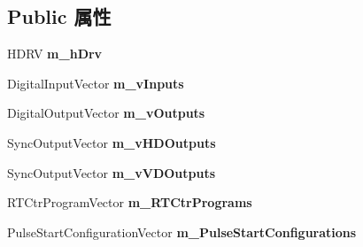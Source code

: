 \subsection*{Public 属性}
\begin{DoxyCompactItemize}
\item 
\hypertarget{structmv_i_m_p_a_c_t_1_1acquire_1_1_i_o_sub_system_1_1_reference_counted_data_a4e64b1cd28107f63b1f9ac99cd8bc306}{H\+D\+R\+V {\bfseries m\+\_\+h\+Drv}}\label{structmv_i_m_p_a_c_t_1_1acquire_1_1_i_o_sub_system_1_1_reference_counted_data_a4e64b1cd28107f63b1f9ac99cd8bc306}

\item 
\hypertarget{structmv_i_m_p_a_c_t_1_1acquire_1_1_i_o_sub_system_1_1_reference_counted_data_a10633fcae955c4242f1f56d23d9629fc}{Digital\+Input\+Vector {\bfseries m\+\_\+v\+Inputs}}\label{structmv_i_m_p_a_c_t_1_1acquire_1_1_i_o_sub_system_1_1_reference_counted_data_a10633fcae955c4242f1f56d23d9629fc}

\item 
\hypertarget{structmv_i_m_p_a_c_t_1_1acquire_1_1_i_o_sub_system_1_1_reference_counted_data_af07070e5622ebde6387814ab2079711f}{Digital\+Output\+Vector {\bfseries m\+\_\+v\+Outputs}}\label{structmv_i_m_p_a_c_t_1_1acquire_1_1_i_o_sub_system_1_1_reference_counted_data_af07070e5622ebde6387814ab2079711f}

\item 
\hypertarget{structmv_i_m_p_a_c_t_1_1acquire_1_1_i_o_sub_system_1_1_reference_counted_data_a3d56c23dc9460cdf2979a09a31b69967}{Sync\+Output\+Vector {\bfseries m\+\_\+v\+H\+D\+Outputs}}\label{structmv_i_m_p_a_c_t_1_1acquire_1_1_i_o_sub_system_1_1_reference_counted_data_a3d56c23dc9460cdf2979a09a31b69967}

\item 
\hypertarget{structmv_i_m_p_a_c_t_1_1acquire_1_1_i_o_sub_system_1_1_reference_counted_data_a2652c5a5d247544f5c5482f449d91fe8}{Sync\+Output\+Vector {\bfseries m\+\_\+v\+V\+D\+Outputs}}\label{structmv_i_m_p_a_c_t_1_1acquire_1_1_i_o_sub_system_1_1_reference_counted_data_a2652c5a5d247544f5c5482f449d91fe8}

\item 
\hypertarget{structmv_i_m_p_a_c_t_1_1acquire_1_1_i_o_sub_system_1_1_reference_counted_data_aba8bc8a1f54c1479e8d5ff8a18494767}{R\+T\+Ctr\+Program\+Vector {\bfseries m\+\_\+\+R\+T\+Ctr\+Programs}}\label{structmv_i_m_p_a_c_t_1_1acquire_1_1_i_o_sub_system_1_1_reference_counted_data_aba8bc8a1f54c1479e8d5ff8a18494767}

\item 
\hypertarget{structmv_i_m_p_a_c_t_1_1acquire_1_1_i_o_sub_system_1_1_reference_counted_data_a745c707fa728710525af2d568144ad83}{Pulse\+Start\+Configuration\+Vector {\bfseries m\+\_\+\+Pulse\+Start\+Configurations}}\label{structmv_i_m_p_a_c_t_1_1acquire_1_1_i_o_sub_system_1_1_reference_counted_data_a745c707fa728710525af2d568144ad83}


\end{DoxyCompactItemize}
